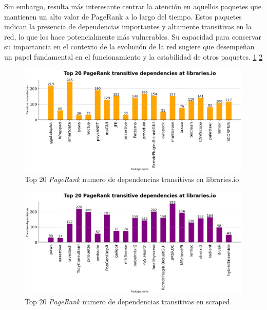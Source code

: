 Sin embargo, resulta más interesante centrar la atención en aquellos paquetes que mantienen un alto valor de
PageRank a lo largo del tiempo. Estos paquetes indican la presencia de dependencias importantes y altamente
transitivas en la red, lo que los hace potencialmente más vulnerables. Su capacidad para conservar su
importancia en el contexto de la evolución de la red sugiere que desempeñan un papel fundamental en el
funcionamiento y la estabilidad de otros paquetes. \ref{fig:Top 20 PageRank numero de dependencias transitivas en libraries.io}
\ref{fig:Top 20 PageRank numero de dependencias transitivas en scraped}

\begin{figure}[h!]
    \begin{center}
        \includegraphics[width=1\textwidth]{img/cran/pr_trans.png}
        \caption{Top 20 \textit{PageRank} numero de dependencias transitivas en libraries.io}
        \label{fig:Top 20 PageRank numero de dependencias transitivas en libraries.io}
    \end{center}
\end{figure}

\begin{figure}[h!]
    \begin{center}
        \includegraphics[width=1\textwidth]{img/cran/pr_trans2.png}
        \caption{Top 20 \textit{PageRank} numero de dependencias transitivas en scraped}
        \label{fig:Top 20 PageRank numero de dependencias transitivas en scraped}
    \end{center}
\end{figure}

